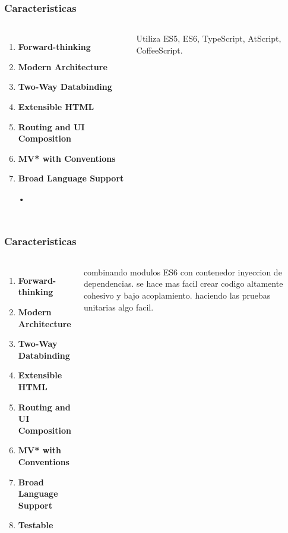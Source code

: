 \documentclass{beamer}
\begin{document}

\begin{frame}
\frametitle{Caracteristicas}
\begin{columns}[c] %

\begin{enumerate}
\item \textbf{Forward-thinking}
\item \textbf{Modern Architecture}
\item \textbf{Two-Way Databinding}
\item \textbf{Extensible HTML}
\item \textbf{Routing and UI Composition}
\item \textbf{MV* with Conventions}
\item \textbf{Broad Language Support}
\item[•]
\end{enumerate}

Utiliza ES5, ES6, TypeScript, AtScript, CoffeeScript.
\end{columns}
\end{frame}


\begin{frame}
\frametitle{Caracteristicas}
\begin{columns}[c] %

\begin{enumerate}
\item \textbf{Forward-thinking}
\item \textbf{Modern Architecture}
\item \textbf{Two-Way Databinding}
\item \textbf{Extensible HTML}
\item \textbf{Routing and UI Composition}
\item \textbf{MV* with Conventions}
\item \textbf{Broad Language Support}
\item \textbf{Testable}
\end{enumerate}

combinando modulos ES6 con contenedor inyeccion de dependencias. se hace mas facil crear codigo altamente cohesivo y bajo acoplamiento. haciendo las pruebas unitarias algo facil.
\end{columns}
\end{frame}
\end{document}

